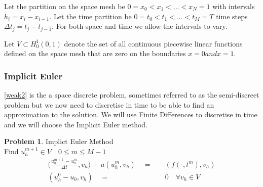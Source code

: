 \documentclass{uonmathreport}
\theoremstyle{definition}
\theoremstyle{problem}
\newtheorem{problem}{Problem}[section]
\theoremstyle{theorem}
\begin{document}
\begin{center}
\end{center}

Let the partition on the space mesh be $0 = x_0< x_1< ...< x_N = 1$ with intervals\\ $h_i = x_i - x_{i-1}$. Let the time partition be $0 = t_0< t_1< ...< t_M = T$ time steps $\Delta t_j = t_j - t_{j-1}$. For both space and time we allow the intervals to vary.

Let $V\subset H^1_0(0, 1)$ denote the set of all continuous piecewise linear functions defined on the space mesh that are zero on the boundaries $x=0 and x=1$. 

\subsubsection{Implicit Euler} \label{subsubsec:Implicit Euler}

\ref{weak2} is the a space discrete problem, sometimes referred to as the semi-discreet problem but we now need to discretise in time to be able to find an approximation to the solution. We will use Finite Differences to discretise in time and we will choose the Implicit Euler method. 


\begin{problem}{Implict Euler Method} \label{eq:Implicit Euler}
\\Find $u_h^{m+1} \in V \quad 0 \leq m \leq M-1$
\begin{align*}
\Big(\frac{u_h^{m+1} \, - \, u_h^{m}}{\Delta t}, v_h \Big) +\: a(u_h^m, v_h) \quad=&\quad (f(\cdot, t^m), v_h) \\
(u^{0}_h - u_0, v_h)\quad  =& \quad0 \quad \forall v_h \in V
\end{align*}
\end{problem}
\end{document}
